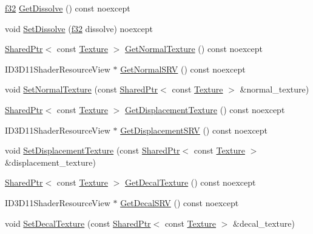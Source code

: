 \begin{DoxyCompactItemize}
\item 
\hyperlink{namespacemage_a6a44ad388483959dc4dff9f2aef91431}{f32} \hyperlink{structmage_1_1_material_a877801e3e4ade6ecfb57565e3201a834}{Get\+Dissolve} () const noexcept
\item 
void \hyperlink{structmage_1_1_material_ac388828669d98c9fb336b292efc7c48d}{Set\+Dissolve} (\hyperlink{namespacemage_a6a44ad388483959dc4dff9f2aef91431}{f32} dissolve) noexcept
\item 
\hyperlink{namespacemage_a1e01ae66713838a7a67d30e44c67703e}{Shared\+Ptr}$<$ const \hyperlink{classmage_1_1_texture}{Texture} $>$ \hyperlink{structmage_1_1_material_a41a286cf05a2627ee0baef602b01a1fb}{Get\+Normal\+Texture} () const noexcept
\item 
I\+D3\+D11\+Shader\+Resource\+View $\ast$ \hyperlink{structmage_1_1_material_a0be98911c56dedaa4fd2f8714fc8a793}{Get\+Normal\+S\+RV} () const noexcept
\item 
void \hyperlink{structmage_1_1_material_a178b5b945137d7aab35db01a2e52ab31}{Set\+Normal\+Texture} (const \hyperlink{namespacemage_a1e01ae66713838a7a67d30e44c67703e}{Shared\+Ptr}$<$ const \hyperlink{classmage_1_1_texture}{Texture} $>$ \&normal\+\_\+texture)
\item 
\hyperlink{namespacemage_a1e01ae66713838a7a67d30e44c67703e}{Shared\+Ptr}$<$ const \hyperlink{classmage_1_1_texture}{Texture} $>$ \hyperlink{structmage_1_1_material_a4ed20c22d218a5e30258172117c4fa0f}{Get\+Displacement\+Texture} () const noexcept
\item 
I\+D3\+D11\+Shader\+Resource\+View $\ast$ \hyperlink{structmage_1_1_material_a638ee0913aa0722f499c883b71549503}{Get\+Displacement\+S\+RV} () const noexcept
\item 
void \hyperlink{structmage_1_1_material_ab1033bb2d635960a6dc6117d71866d28}{Set\+Displacement\+Texture} (const \hyperlink{namespacemage_a1e01ae66713838a7a67d30e44c67703e}{Shared\+Ptr}$<$ const \hyperlink{classmage_1_1_texture}{Texture} $>$ \&displacement\+\_\+texture)
\item 
\hyperlink{namespacemage_a1e01ae66713838a7a67d30e44c67703e}{Shared\+Ptr}$<$ const \hyperlink{classmage_1_1_texture}{Texture} $>$ \hyperlink{structmage_1_1_material_a059dccc9de58535541ab4286b0bb73e4}{Get\+Decal\+Texture} () const noexcept
\item 
I\+D3\+D11\+Shader\+Resource\+View $\ast$ \hyperlink{structmage_1_1_material_a8d189673acfe8d0c104873fe0cceb601}{Get\+Decal\+S\+RV} () const noexcept
\item 
void \hyperlink{structmage_1_1_material_a68207beea9dcea8a6921f89e4b5d0950}{Set\+Decal\+Texture} (const \hyperlink{namespacemage_a1e01ae66713838a7a67d30e44c67703e}{Shared\+Ptr}$<$ const \hyperlink{classmage_1_1_texture}{Texture} $>$ \&decal\+\_\+texture)

\end{DoxyCompactItemize}

